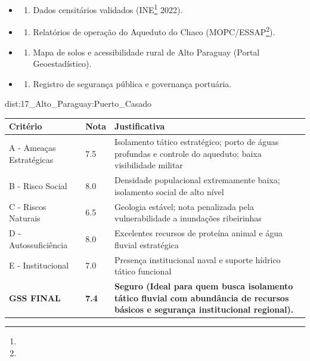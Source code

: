 {\begin{itemize}
\tightlist
\item
  \begin{enumerate}
  \def\labelenumi{\arabic{enumi})}
  \tightlist
  \item
    Dados censitários validados (INE\footnote{\fineINE} 2022).
  \end{enumerate}
\item
  \begin{enumerate}
  \def\labelenumi{\arabic{enumi})}
  \setcounter{enumi}{1}
  \tightlist
  \item
    Relatórios de operação do Aqueduto do Chaco (MOPC/\allowbreak ESSAP\footnote{\fineESSAP}).
  \end{enumerate}
\item
  \begin{enumerate}
  \def\labelenumi{\arabic{enumi})}
  \setcounter{enumi}{2}
  \tightlist
  \item
    Mapa de solos e acessibilidade rural de Alto Paraguay (Portal
    Geoestadístico).
  \end{enumerate}
\item
  \begin{enumerate}
  \def\labelenumi{\arabic{enumi})}
  \setcounter{enumi}{3}
  \tightlist
  \item
    Registro de segurança pública e governança portuária.
  \end{enumerate}
\end{itemize}}{dist:17_Alto_Paraguay:Puerto_Casado}
\begin{table}[ht!]
\small \begin{tabular}{p{3.0cm}p{0.8cm}p{6.0cm}} \toprule
\textbf{Critério} & \textbf{Nota} & \textbf{Justificativa} \\ \midrule
A - Ameaças Estratégicas & 7.5 & Isolamento tático estratégico; porto de águas profundas e controle do aqueduto; baixa visibilidade militar \\
B - Risco Social & 8.0 & Densidade populacional extremamente baixa; isolamento social de alto nível \\
C - Riscos Naturais & 6.5 & Geologia estável; nota penalizada pela vulnerabilidade a inundações ribeirinhas \\
D - Autossuficiência & 8.0 & Excelentes recursos de proteína animal e água fluvial estratégica \\
E - Institucional & 7.0 & Presença institucional naval e suporte hídrico tático funcional \\
\midrule \textbf{GSS FINAL} & \textbf{7.4} & \textbf{Seguro (Ideal para quem busca isolamento tático fluvial com abundância de recursos básicos e segurança institucional regional).} \\ \bottomrule \end{tabular}
\end{table}
